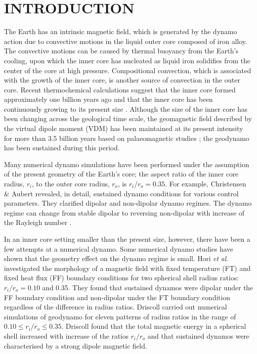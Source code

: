 \section{INTRODUCTION}

The Earth has an intrinsic magnetic field, which is generated by the dynamo action due to convective motions in the liquid outer core composed of iron alloy.
The convective motions can be caused by thermal buoyancy from the Earth's cooling, upon which the inner core has nucleated as liquid iron solidifies from the center of the core at high pressure.
Compositional convection, which is associated with the growth of the inner core, is another source of convection in the outer core.
Recent thermochemical calculations suggest that the inner core formed approximately one billion years ago and that the inner core has been continuously growing to its present size \cite{Labrosse:2001}.
Although the size of the inner core has been changing across the geological time scale, the geomagnetic field described by the virtual dipole moment (VDM) has been maintained at its present intensity for more than 3.5 billion years based on palaeomagnetic studies \cite{Biggin:2015}; the geodynamo has been sustained during this period.

Many numerical dynamo simulations have been performed under the assumption of the present geometry of the Earth’s core; the aspect ratio of the inner core radius, $r_{i}$, to the outer core radius, $r_{o}$, is $r_{i} / r_{o} = 0.35$.
For example, Christensen \& Aubert  revealed, in detail, sustained dynamo conditions for various control parameters. 
They clarified dipolar and non-dipolar dynamo regimes.
The dynamo regime can change from stable dipolar to reversing non-dipolar with increase of the Rayleigh number \cite{Kutzner:2002,Olson:2011}.

In an inner core setting smaller than the present size, however, there have been a few attempts at a numerical dynamo. 
Some numerical dynamo studies have shown that the geometry effect on the dynamo regime is small. 
Hori {\it et al.}  investigated the morphology of a magnetic field with fixed temperature (FT) and fixed heat flux (FF) boundary conditions for two spherical shell radius ratios: $r_{i} / r_{o} = 0.10$ and 0.35. 
They found that sustained dynamos were dipolar under the FF boundary condition and non-dipolar under the FT boundary condition regardless of the difference in radius ratios. 
Driscoll  carried out numerical simulations of geodynamo for eleven patterns of radius ratios in the range of 
$0.10 \le r_{i} / r_{o} \le 0.35$.
Driscoll  found that the total magnetic energy in a spherical shell increased with increase of the ratios $r_{i} / r_{o}$ and that sustained dynamos were characterised by a strong dipole magnetic field.

